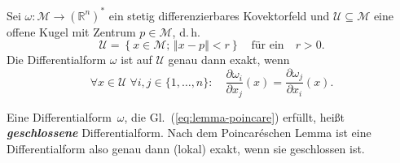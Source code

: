 \begin{lemma}
\label{lem:poincare}Sei
$\omega:\mathcal{M}\to({\mathbb{R}}^{n})^{*}$ ein stetig differenzierbares
Kovektorfeld und $\mathcal{U}\subseteq\mathcal{M}$ eine offene Kugel
mit Zentrum $p\in\mathcal{M}$, d.\,h.
\[
\mathcal{U}=\left\{ x\in\mathcal{M};\,\left\Vert x-p\right\Vert <r\right\} \quad\textrm{für ein}\quad r>0.
\]
Die Differentialform $\omega$ ist auf $\mathcal{U}$ genau dann exakt,
wenn
\begin{equation}
\forall x\in\mathcal{U}\;\forall i,j\in\{1,\ldots,n\}:\quad\frac{\partial\omega_{i}}{\partial x_{j}}(x)=\frac{\partial\omega_{j}}{\partial x_{i}}(x).\label{eq:lemma-poincare}
\end{equation}
\end{lemma}
Eine Differentialform~$\omega$, die Gl.~(\ref{eq:lemma-poincare})
erfüllt, heißt \textbf{\em geschlossene} Differentialform.
Nach dem Poincaréschen Lemma ist eine Differentialform also genau
dann (lokal) exakt, wenn sie geschlossen ist.
